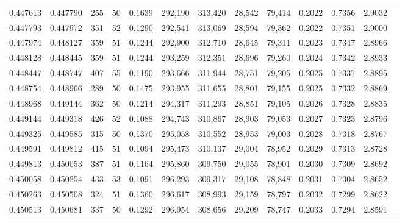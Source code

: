 \begin{tabular}{rrrrrrrrrrrrr}
0.447613 & 0.447790 &   255 &  50 &                                     0.1639 & 292,190 & 313,420 &  28,542 &  79,414 & 0.2022 & 0.7356 & 2.9032 \\
0.447793 & 0.447972 &   351 &  52 &                                     0.1290 & 292,541 & 313,069 &  28,594 &  79,362 & 0.2022 & 0.7351 & 2.9000 \\
0.447974 & 0.448127 &   359 &  51 &                                     0.1244 & 292,900 & 312,710 &  28,645 &  79,311 & 0.2023 & 0.7347 & 2.8966 \\
0.448128 & 0.448445 &   359 &  51 &                                     0.1244 & 293,259 & 312,351 &  28,696 &  79,260 & 0.2024 & 0.7342 & 2.8933 \\
0.448447 & 0.448747 &   407 &  55 &                                     0.1190 & 293,666 & 311,944 &  28,751 &  79,205 & 0.2025 & 0.7337 & 2.8895 \\
0.448754 & 0.448966 &   289 &  50 &                                     0.1475 & 293,955 & 311,655 &  28,801 &  79,155 & 0.2025 & 0.7332 & 2.8869 \\
0.448968 & 0.449144 &   362 &  50 &                                     0.1214 & 294,317 & 311,293 &  28,851 &  79,105 & 0.2026 & 0.7328 & 2.8835 \\
0.449144 & 0.449318 &   426 &  52 &                                     0.1088 & 294,743 & 310,867 &  28,903 &  79,053 & 0.2027 & 0.7323 & 2.8796 \\
0.449325 & 0.449585 &   315 &  50 &                                     0.1370 & 295,058 & 310,552 &  28,953 &  79,003 & 0.2028 & 0.7318 & 2.8767 \\
0.449591 & 0.449812 &   415 &  51 &                                     0.1094 & 295,473 & 310,137 &  29,004 &  78,952 & 0.2029 & 0.7313 & 2.8728 \\
0.449813 & 0.450053 &   387 &  51 &                                     0.1164 & 295,860 & 309,750 &  29,055 &  78,901 & 0.2030 & 0.7309 & 2.8692 \\
0.450058 & 0.450254 &   433 &  53 &                                     0.1091 & 296,293 & 309,317 &  29,108 &  78,848 & 0.2031 & 0.7304 & 2.8652 \\
0.450263 & 0.450508 &   324 &  51 &                                     0.1360 & 296,617 & 308,993 &  29,159 &  78,797 & 0.2032 & 0.7299 & 2.8622 \\
0.450513 & 0.450681 &   337 &  50 &                                     0.1292 & 296,954 & 308,656 &  29,209 &  78,747 & 0.2033 & 0.7294 & 2.8591 \\

\end{tabular}
